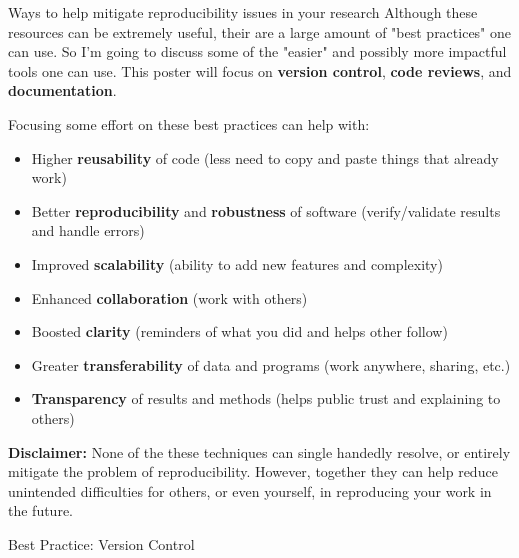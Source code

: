 \documentclass[final]{beamer}
\newlength{\colwidth}
\begin{document}
\begin{frame}[t]
\begin{columns}[t]
\begin{column}{\colwidth}
\begin{exampleblock}{Ways to help mitigate reproducibility issues in your research}
    Although these resources can be extremely useful, their are a large amount
    of "best practices" one can use.
    So I'm going to discuss some of the "easier" and possibly more impactful
    tools one can use.
    This poster will focus on \textbf{version control}, \textbf{code reviews},
    and \textbf{documentation}.
    
    Focusing some effort on these best practices can help with:
    \begin{itemize}
      \item Higher \textbf{reusability} of code (less need to copy and paste
        things that already work)
      \item Better \textbf{reproducibility} and \textbf{robustness} of software
        (verify/validate results and handle errors)
      \item Improved \textbf{scalability} (ability to add new features and
        complexity)
      \item Enhanced \textbf{collaboration} (work with others)
      \item Boosted \textbf{clarity} (reminders of what you did and helps other
        follow)
      \item Greater \textbf{transferability} of data and programs (work
        anywhere, sharing, etc.)
      \item \textbf{Transparency} of results and methods (helps public trust
        and explaining to others)
    \end{itemize}
    
    \textbf{Disclaimer:} None of the these techniques can single handedly
    resolve, or entirely mitigate the problem of reproducibility.
    However, together they can help reduce unintended difficulties for others,
    or even yourself, in reproducing your work in the future.

  \end{exampleblock}

  \begin{block}{Best Practice: Version Control}


\end{block}
\end{column}
\end{columns}
\end{frame}
\end{document}

